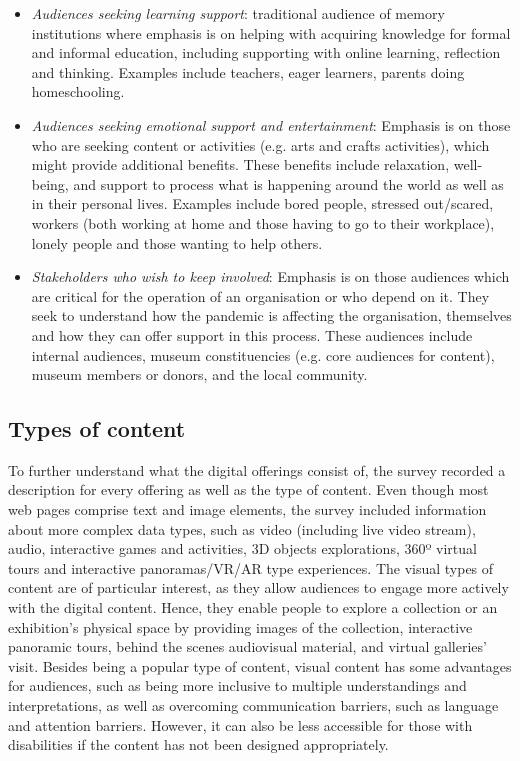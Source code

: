 \documentclass{egpubl}
\begin{document}
\begin{itemize}
	\item \textit{Audiences seeking learning support}: traditional audience of memory institutions where emphasis is on helping with acquiring knowledge for formal and informal education, including supporting with online learning, reflection and thinking. Examples include teachers, eager learners, parents doing homeschooling.
	\item \textit{Audiences seeking emotional support and entertainment}: Emphasis is on those who are seeking content or activities (e.g. arts and crafts activities), which might provide additional benefits. These benefits include relaxation, well-being, and support to process what is happening around the world as well as in their personal lives. Examples include bored people, stressed out/scared, workers (both working at home and those having to go to their workplace), lonely people and those wanting to help others. 
	\item \textit{Stakeholders who wish to keep involved}: Emphasis is on those audiences which are critical for the operation of an organisation or who depend on it. They seek to understand how the pandemic is affecting the organisation, themselves and how they can offer support in this process. These audiences include internal audiences, museum constituencies (e.g. core audiences for content), museum members or donors, and the local community.
\end{itemize}


\subsection{Types of content}
\label{typ}
To further understand what the digital offerings consist of, the survey recorded a description for every offering as well as the type of content. Even though most web pages comprise text and image elements, the survey included information about more complex data types, such as video (including live video stream), audio, interactive games and activities, 3D objects explorations, 360º virtual tours and interactive panoramas/VR/AR type experiences.
The visual types of content are of particular interest, as they allow audiences to engage more actively with the digital content. Hence, they enable people to explore a collection or an exhibition's physical space by providing images of the collection, interactive panoramic tours, behind the scenes audiovisual material, and virtual galleries' visit. Besides being a popular type of content, visual content has some advantages for audiences, such as being more inclusive to multiple understandings and interpretations, as well as overcoming communication barriers, such as language and attention barriers. However, it can also be less accessible for those with disabilities if the content has not been designed appropriately.
\end{document}
